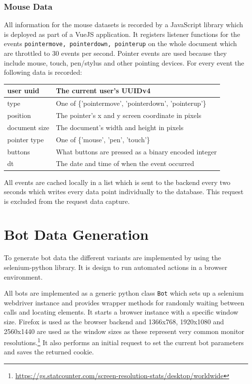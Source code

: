 \documentclass[
    fontsize=12pt,
    headings=small,
    parskip=half,           %
    bibliography=totoc,
    numbers=noenddot,       %
    open=any,               %
    final                   %
]{scrreprt}
\begin{document}
\subsubsection{Mouse Data}

All information for the mouse datasets is recorded by a JavaScript library which is deployed as part of a VueJS application. It registers listener functions for the events \lstinline{pointermove, pointerdown, pointerup} on the whole document which are throttled to $30$ events per second. Pointer events are used because they include mouse, touch, pen/stylus and other pointing devices. For every event the following data is recorded:


\begin{table}[]
\begin{tabular}{|l|l|}
\hline
user uuid & The current user's UUIDv4 \\ \hline
type & One of \{'pointermove', 'pointerdown', 'pointerup'\} \\ \hline
position & The pointer's x and y screen coordinate in pixels \\ \hline
document size & The document's width and height in pixels \\ \hline
pointer type & One of \{'mouse', 'pen', 'touch'\} \\ \hline
buttons & What buttons are pressed as a binary encoded integer \\ \hline
dt & The date and time of when the event occurred \\ \hline

\end{tabular}
\end{table}

All events are cached locally in a list which is sent to the backend every two seconds which writes every data point individually to the database. This request is excluded from the request data capture.

\section{Bot Data Generation}

To generate bot data the different variants are implemented by using the selenium-python \cite{SELENIUMPYTHON} library. It is design to run automated actions in a browser environment.


All bots are implemented as a generic python class \lstinline{Bot} which sets up a selenium\cite{SELENIUMPYTHON} webdriver instance and provides wrapper methods for randomly waiting between calls and locating elements. It starts a  browser instance with a specific window size. Firefox is used as the browser backend and 1366x768, 1920x1080 and 2560x1440 are used as the window sizes as these represent very common monitor resolutions.\footnote{\url{https://gs.statcounter.com/screen-resolution-stats/desktop/worldwide}} It also performs an initial request to set the current bot parameters and saves the returned cookie.
\end{document}
